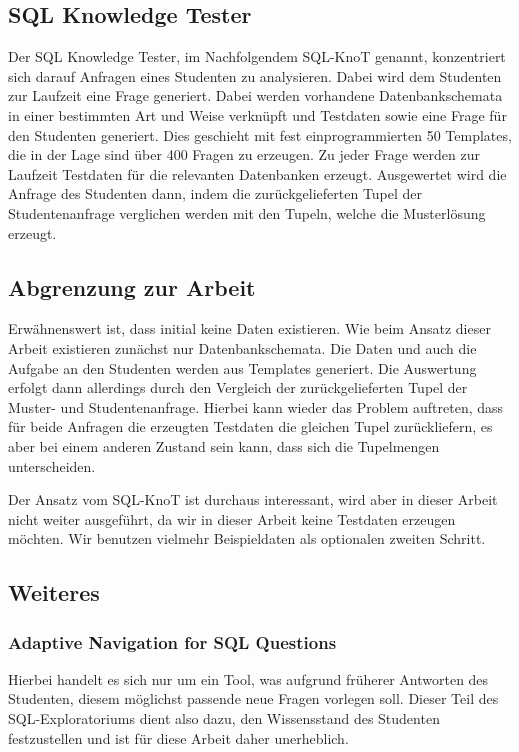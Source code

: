 \subsection{SQL Knowledge Tester}

Der SQL Knowledge Tester, im Nachfolgendem SQL-KnoT genannt, konzentriert sich darauf Anfragen eines Studenten zu analysieren. Dabei wird dem Studenten zur Laufzeit eine Frage generiert. Dabei werden vorhandene Datenbankschemata in einer bestimmten Art und Weise verknüpft und Testdaten sowie eine Frage für den Studenten generiert. Dies geschieht mit fest einprogrammierten 50 Templates, die in der Lage sind über 400 Fragen zu erzeugen. Zu jeder Frage werden zur Laufzeit Testdaten für die relevanten Datenbanken erzeugt. Ausgewertet wird die Anfrage des Studenten dann, indem die zurückgelieferten Tupel der Studentenanfrage verglichen werden mit den Tupeln, welche die Musterlösung erzeugt. 

\subsection*{Abgrenzung zur Arbeit}

Erwähnenswert ist, dass initial keine Daten existieren. Wie beim Ansatz dieser Arbeit existieren zunächst nur Datenbankschemata. Die Daten und auch die Aufgabe an den Studenten werden aus Templates generiert. Die Auswertung erfolgt dann allerdings durch den Vergleich der zurückgelieferten Tupel der Muster- und Studentenanfrage. Hierbei kann wieder das Problem auftreten, dass für beide Anfragen die erzeugten Testdaten die gleichen Tupel zurückliefern, es aber bei einem anderen Zustand sein kann, dass sich die Tupelmengen unterscheiden. 

Der Ansatz vom SQL-KnoT ist durchaus interessant, wird aber in dieser Arbeit nicht weiter ausgeführt, da wir in dieser Arbeit keine Testdaten erzeugen möchten. Wir benutzen vielmehr Beispieldaten als optionalen zweiten Schritt.

\subsection{Weiteres}

\subsubsection{Adaptive Navigation for SQL Questions}

Hierbei handelt es sich nur um ein Tool, was aufgrund früherer Antworten des Studenten, diesem möglichst passende neue Fragen vorlegen soll. Dieser Teil des SQL-Exploratoriums dient also dazu, den Wissensstand des Studenten festzustellen und ist für diese Arbeit daher unerheblich. 

